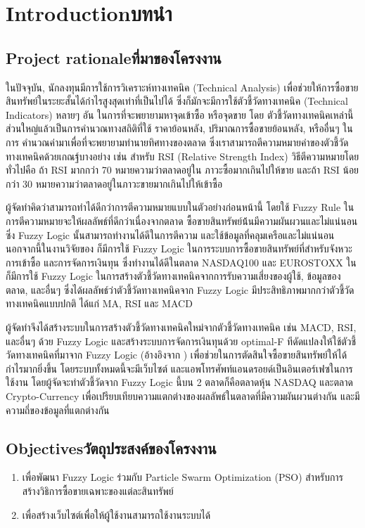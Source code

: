 \chapter{\ifenglish Introduction\else บทนำ\fi}

\section{\ifenglish Project rationale\else ที่มาของโครงงาน\fi}
ในปัจจุบัน, นักลงทุนมีการใช้การวิเคราะห์ทางเทคนิค (Technical Analysis) เพื่อช่วยให้การซื้อขายสินทรัพย์ในระยะสั้นได้กำไรสูงสุดเท่าที่เป็นไปได้
ซึ่งก็มักจะมีการใช้ตัวชี้วัดทางเทคนิค (Technical Indicators) หลายๆ อัน ในการที่จะพยายามหาจุดเข้าซื้อ หรือจุดขาย โดย 
ตัวชี้วัดทางเทคนิคเหล่านี้ส่วนใหญ่แล้วเป็นการคำนวณทางสถิติที่ใช้ ราคาย้อนหลัง, ปริมาณการซื้อขายย้อนหลัง, หรืออื่นๆ ในการ
คำนวณค่ามาเพื่อที่จะพยายามทำนายทิศทางของตลาด ซึ่งเราสามารถตีความหมายค่าของตัวชี้วัดทางเทคนิคด้วยเกณฐ์บางอย่าง เช่น 
สำหรับ RSI (Relative Strength Index) วิธีตีความหมายโดยทั่วไปคือ ถ้า RSI มากกว่า 70 หมายความว่าตลาดอยู่ใน
ภาวะซื้อมากเกินไปให้ขาย และถ้า RSI น้อยกว่า 30 หมายความว่าตลาดอยู่ในภาวะขายมากเกินไปให้เข้าซื้อ

ผู้จัดทำคิดว่าสามารถทำได้ดีกว่าการตีความหมายแบบในตัวอย่างก่อนหน้านี้ โดยใช้ Fuzzy Rule ในการตีความหมายจะให้ผลลัพธ์ที่ดีกว่าเนื่องจากตลาด
ซื้อขายสินทรัพย์น้้นมีความผันผวนและไม่แน่นอน ซึ่ง Fuzzy Logic นั้นสามารถทำงานได้ดีในการตีความ และใช้ข้อมูลที่คลุมเครือและไม่แน่นอน
นอกจากนี้ในงานวิจัยของ \cite{Rodrigo} ก็มีการใช้ Fuzzy Logic ในการระบบการซื้อขายสินทรัพย์ที่สำหรับจังหวะการเข้าซื้อ
และการจัดการเงินทุน ซึ่งทำงานได้ดีในตลาด NASDAQ100 และ EUROSTOXX ใน \cite{Escobar} ก็มีการใช้ Fuzzy Logic
ในการสร้างตัวชี้วัดทางเทคนิคจากการรับความเสี่ยงของผู้ใช้, ข้อมูลของตลาด, และอื่นๆ ซึ่งได้ผลลัพธ์ว่าตัวชี้วัดทางเทคนิคจาก Fuzzy Logic
มีประสิทธิภาพมากกว่าตัวชี้วัดทางเทคนิคแบบปกติ ได้แก่ MA, RSI และ MACD

ผู้จัดทำจึงได้สร้างระบบในการสร้างตัวชี้วัดทางเทคนิคใหม่จากตัวชี้วัดทางเทคนิค เช่น MACD, RSI, และอื่นๆ ด้วย Fuzzy Logic และสร้างระบบการจัดการเงินทุนด้วย
optimal-F ทีดัดแปลงให้ใช้ตัวชี้วัดทางเทคนิคที่มาจาก Fuzzy Logic (อ้างอิงจาก \cite{Rodrigo}) เพื่อช่วยในการตัดสินใจซื้อขายสินทรัพย์ให้ได้กำไรมากยิ่งขึ้น
โดยระบบทั้งหมดนี้จะมีเว็บไซต์ และแอพโทรศัพท์แอนดรอยด์เป็นอินเตอร์เฟซในการใช้งาน โดยผู้จัดจะทำตัวชี้วัดจาก Fuzzy Logic นี้บน 2 ตลาดก็คือตลาดหุ้น NASDAQ และตลาด Crypto-Currency
เพื่อเปรียบเทียบความแตกต่างของผลลัพธ์ในตลาดที่มีความผันผวนต่างกัน และมีความถึ่ของข้อมูลที่แตกต่างกัน

\section{\ifenglish Objectives\else วัตถุประสงค์ของโครงงาน\fi}
\begin{enumerate}
    \item เพื่อพัฒนา Fuzzy Logic ร่วมกับ Particle Swarm Optimization (PSO) สำหรับการสร้างวิธิการซื้อขายเฉพาะของแต่ละสินทรัพย์
    \item เพื่อสร้างเว็บไซต์เพื่อให้ผู้ใช้งานสามารถใช้งานระบบได้
\end{enumerate}

